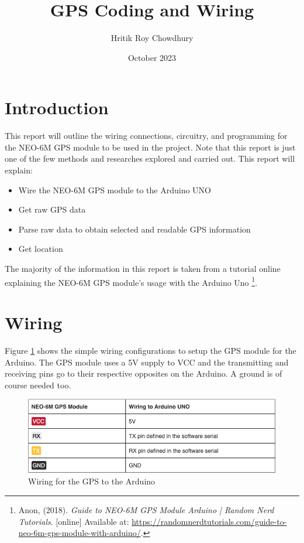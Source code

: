 \documentclass{article}
\title{GPS Coding and Wiring}
\author{Hritik Roy Chowdhury}
\date{October 2023}
\begin{document}
\maketitle

\section{Introduction}
This report will outline the wiring connections, circuitry, and programming for the NEO-6M GPS module to be used in the project. Note that this report is just one of the few methods and 
researches explored and carried out. This report will explain:
\begin{itemize}
    \item Wire the NEO-6M GPS module to the Arduino UNO
    \item Get raw GPS data
    \item Parse raw data to obtain selected and readable GPS information
    \item Get location
\end{itemize}
The majority of the information in this report is taken from a tutorial online explaining the NEO-6M GPS module's usage with the Arduino Uno 
\footnote{
Anon, (2018). \textit{Guide to NEO-6M GPS Module Arduino | Random Nerd Tutorials}. [online] Available at: \url{https://randomnerdtutorials.com/guide-to-neo-6m-gps-module-with-arduino/}.
}.

\section{Wiring}
Figure \ref{fig:connections} shows the simple wiring configurations to setup the GPS module for the Arduino. The GPS module uses a 5V supply to VCC and the transmitting and receiving pins go to their respective opposites on the Arduino. A ground is of course needed too.
\begin{figure}[H]
    \centering
    \includegraphics[width=\textwidth]{connections.png}
    \caption{Wiring for the GPS to the Arduino}
    \label{fig:connections}
\end{figure}
\end{document}
